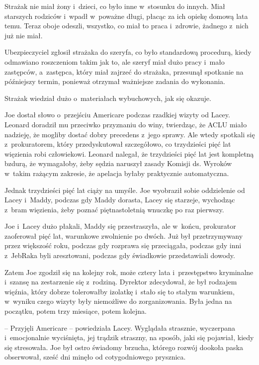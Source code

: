\documentclass[oneside,polish,11pt,sfheadings]{mwbk}
\begin{document}
Strażak nie miał żony i~dzieci, co było inne w~stosunku do innych. Miał
starszych rodziców i~wpadł w~poważne długi, płacąc za ich opiekę domową
lata temu. Teraz oboje odeszli, wszystko, co miał to praca i~zdrowie,
żadnego z~nich już nie miał.

Ubezpieczyciel zgłosił strażaka do szeryfa, co było standardową
procedurą, kiedy odmawiano roszczeniom takim jak to, ale szeryf miał
dużo pracy i~mało zastępców, a~zastępca, który miał zajrzeć do strażaka,
przesunął spotkanie na późniejszy termin, ponieważ otrzymał ważniejsze
zadania do wykonania.

Strażak wiedział dużo o~materiałach wybuchowych, jak się okazuje.

Joe dostał słowo o~przejściu Americare podczas rzadkiej wizyty od Lacey.
Leonard doradził mu przeciwko przyznaniu do winy, twierdząc, że ACLU
miało nadzieję, że mogliby dostać dobry precedens z~jego sprawy. Ale
wtedy spotkali się z~prokuratorem, który przedyskutował szczegółowo, co
trzydzieści pięć lat więzienia robi człowiekowi. Leonard nalegał, że
trzydzieści pięć lat jest kompletną bzdurą, że wymagałoby, żeby sędzia
naruszył zasady Komisji ds. Wyroków w~takim rażącym zakresie, że
apelacja byłaby praktycznie automatyczna.

Jednak trzydzieści pięć lat ciąży na umyśle. Joe wyobraził sobie
oddzielenie od Lacey i~Maddy, podczas gdy Maddy dorasta, Lacey się
starzeje, wychodząc z~bram więzienia, żeby poznać piętnastoletnią
wnuczkę po raz pierwszy.

Joe i~Lacey dużo płakali, Maddy się przestraszyła, ale w~końcu,
prokurator zaoferował pięć lat, warunkowe zwolnienie po dwóch. Już był
przetrzymywany przez większość roku, podczas gdy rozprawa się
przeciągała, podczas gdy inni z~JebRaka byli aresztowani, podczas gdy
świadkowie przedstawiali dowody.

Zatem Joe zgodził się na kolejny rok, może cztery lata i~przestępstwo
kryminalne i~szansę na zestarzenie się z~rodziną. Dyrektor zdecydował,
że był rodzajem więźnia, który dobrze tolerowałby izolatkę i~stało się
to stałym warunkiem, w~wyniku czego wizyty były niemożliwe do
zorganizowania. Była jedna na początku, potem trzy miesiące, potem
kolejna.

-- Przyjęli Americare -- powiedziała Lacey. Wyglądała strasznie,
wyczerpana i~emocjonalnie wyciśnięta, jej trądzik straszny, na sposób,
jaki się pojawiał, kiedy się stresowała. Joe był ostro świadomy brzucha,
którego rozwój dookoła paska obserwował, sześć dni minęło od
cotygodniowego prysznica.
\end{document}

